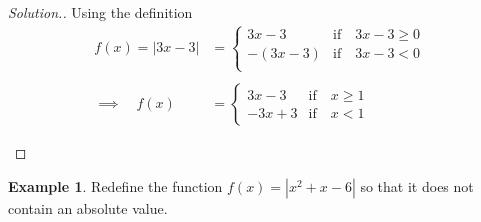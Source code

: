 \documentclass[11pt,a4paper]{article}
\theoremstyle{definition}
\newtheorem{example}[thm]{Example}
\newenvironment{solution}
  {\renewcommand{\qedsymbol}{}\begin{proof}[\textit{Solution}.]}
  {\end{proof}}
\begin{document}
\begin{solution}

Using the definition
\begin{align*}
f(x)=|3x-3| & =
\begin{cases}
3x-3 & \text{if}\quad  3x-3\geq 0\\
-(3x-3) & \text{if}\quad  3x-3<0\\
\end{cases}\\\\
\implies \quad  f(x) & = 
\begin{cases}
3x-3 & \text{if}\quad  x\geq 1\\
-3x+3 & \text{if}\quad  x<1
\end{cases}
\end{align*}






\begin{figure}[h!]
\centering
{}
\end{figure}


\vspace{0.5cm}
\end{solution}
\begin{example}

Redefine the function $f(x)=\left|x^{2}+x-6\right|$ so that it does not contain an absolute value.
\end{example}
\end{document}
